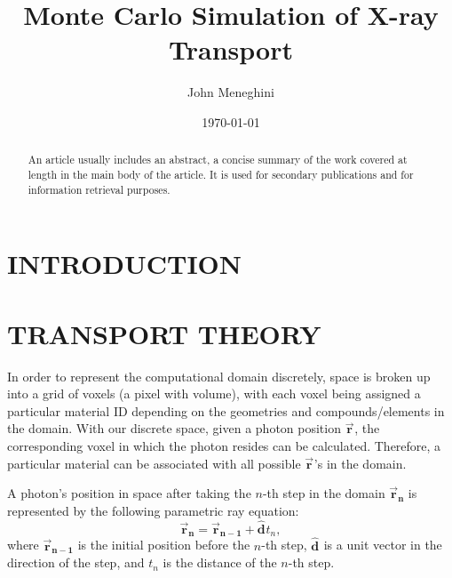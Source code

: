 \documentclass[%
 aip,
cp,  %
 amsmath,amssymb,%
reprint,%
]{revtex4-2}
\newcommand{\vecb}[3]{
\bm{\vec{#1}_{#2}^{#3}}
}
\newcommand{\uvecb}[3]{
\bm{\hat{#1}_{#2}^{#3}}
}
\begin{document}
\title{Monte Carlo Simulation of X-ray Transport}%

\author{John Meneghini} %

\date{\today} %

\begin{abstract}
An article usually includes an abstract, a concise summary of the work
covered at length in the main body of the article. It is used for
secondary publications and for information retrieval purposes.
\end{abstract}

\maketitle

\section{INTRODUCTION}



\section{TRANSPORT THEORY}
\par In order to represent the computational domain discretely, space is broken up into a grid of voxels (a pixel with volume), with each voxel being assigned a particular material ID depending on the geometries and compounds/elements in the domain. With our discrete space, given a photon position $\vecb{r}{}{}$, the corresponding voxel in which the photon resides can be calculated. Therefore, a particular material can be associated with all possible $\vecb{r}{}{}$'s in the domain.

\par A photon's position in space after taking the $n$-th step in the domain $\vecb{r}{n}{}$ is represented by the following parametric ray equation:
\begin{equation}
    \vecb{r}{n}{} = \vecb{r}{n-1}{} + \uvecb{d}{}{} t_n,
\end{equation}
where $\vecb{r}{n-1}{}$ is the initial position before the $n$-th step, $\uvecb{d}{}{}$ is a unit vector in the direction of the step, and $t_n$ is the distance of the $n$-th step.
\end{document}
